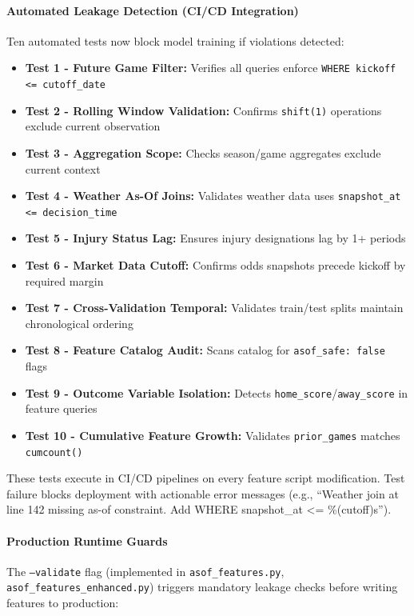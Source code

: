 \paragraph{Automated Leakage Detection (CI/CD Integration)}

Ten automated tests now block model training if violations detected:

\begin{itemize}
    \item \textbf{Test 1 - Future Game Filter:} Verifies all queries enforce \texttt{WHERE kickoff <= cutoff\_date}
    \item \textbf{Test 2 - Rolling Window Validation:} Confirms \texttt{shift(1)} operations exclude current observation
    \item \textbf{Test 3 - Aggregation Scope:} Checks season/game aggregates exclude current context
    \item \textbf{Test 4 - Weather As-Of Joins:} Validates weather data uses \texttt{snapshot\_at <= decision\_time}
    \item \textbf{Test 5 - Injury Status Lag:} Ensures injury designations lag by 1+ periods
    \item \textbf{Test 6 - Market Data Cutoff:} Confirms odds snapshots precede kickoff by required margin
    \item \textbf{Test 7 - Cross-Validation Temporal:} Validates train/test splits maintain chronological ordering
    \item \textbf{Test 8 - Feature Catalog Audit:} Scans catalog for \texttt{asof\_safe: false} flags
    \item \textbf{Test 9 - Outcome Variable Isolation:} Detects \texttt{home\_score}/\texttt{away\_score} in feature queries
    \item \textbf{Test 10 - Cumulative Feature Growth:} Validates \texttt{prior\_games} matches \texttt{cumcount()}
\end{itemize}

These tests execute in CI/CD pipelines on every feature script modification. Test failure blocks deployment with actionable error messages (e.g., ``Weather join at line 142 missing as-of constraint. Add WHERE snapshot\_at <= \%(cutoff)s'').

\paragraph{Production Runtime Guards}

The \texttt{--validate} flag (implemented in \texttt{asof\_features.py}, \texttt{asof\_features\_enhanced.py}) triggers mandatory leakage checks before writing features to production:

